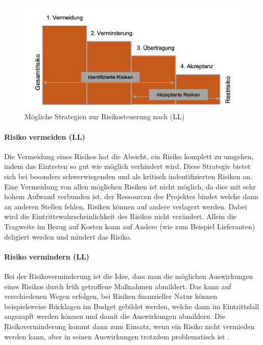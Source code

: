 \documentclass[ThesisDJ.tex]{subfiles}
\begin{document}
\begin{figure}
    \centering
    \includegraphics[width=\linewidth]{risiken.png}
    \caption{Mögliche Strategien zur Risikosteuerung nach \cite{cicek2022risikomanagement} (LL)}
    \label{fig:riskstrats}
\end{figure}

\paragraph{Risiko vermeiden (LL)}
Die Vermeidung eines Risikos hat die Absicht, ein Risiko komplett zu umgehen, indem das Eintreten so gut wie möglich verhindert wird. Diese Strategie bietet sich bei besonders schwerwiegenden und als kritisch indentifizierten Risiken an. Eine Vermeidung von allen möglichen Risiken ist nicht möglich, da dies mit sehr hohem Aufwand verbunden ist, der Ressourcen des Projektes bindet welche dann an anderen Stellen fehlen.
Risiken können auf andere verlagert werden. Dabei wird die Eintrittswahrscheinlichkeit des Risikos nicht verändert. Allein die Tragweite im Bezug auf Kosten kann auf Andere (wie zum Beispiel Lieferanten) deligiert werden und mindert das Risiko.


\paragraph{Risiko vermindern (LL)}
Bei der Risikoverminderung ist die Idee, dass man die möglichen Auswirkungen eines Risikos durch früh getroffene Maßnahmen abmildert. Das kann auf verschiedenen Wegen erfolgen, bei Risiken finanzieller Natur können beispielsweise Rücklagen im Budget gebildet werden, welche dann im Eintrittsfall angezapft werden können und damit die Auswirkungen abmildern. Die Risikoverminderung kommt dann zum Einsatz, wenn ein Risiko nicht vermieden werden kann, aber in seinen Auswirkungen trotzdem problematisch ist \cite{dechange_projektmanagement_2024}.
\end{document}
